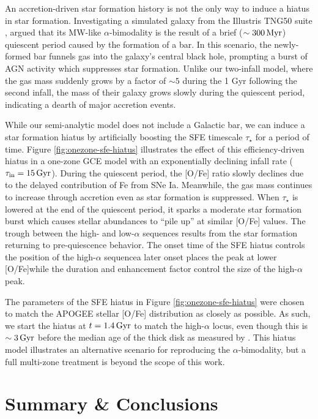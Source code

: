 \documentclass[twocolumn,twocolappendix,linenumbers]{aastex631}
\newcommand{\Gyr}{\,{\rm Gyr}}
\begin{document}
An accretion-driven star formation history is not the only way to induce a hiatus in star formation. Investigating a simulated galaxy from the Illustris TNG50 suite \citep{pillepich_first_2019,nelson_first_2019,nelson_illustristng_2019}, \citet{beane_rising_2024} argued that its MW-like $\alpha$-bimodality is the result of a brief ($\sim300\,{\rm Myr}$) quiescent period caused by the formation of a bar. In this scenario, the newly-formed bar funnels gas into the galaxy's central black hole, prompting a burst of AGN activity which suppresses star formation. Unlike our two-infall model, where the gas mass suddenly grows by a factor of $\sim5$ during the 1 Gyr following the second infall, the mass of their galaxy grows slowly during the quiescent period, indicating a dearth of major accretion events.

While our semi-analytic model does not include a Galactic bar, we can induce a star formation hiatus by artificially boosting the SFE timescale $\tau_\star$ for a period of time. Figure \ref{fig:onezone-sfe-hiatus} illustrates the effect of this efficiency-driven hiatus in a one-zone GCE model with an exponentially declining infall rate ($\tau_{\rm in}=15\Gyr$). During the quiescent period, the [O/Fe] ratio slowly declines due to the delayed contribution of Fe from SNe Ia. Meanwhile, the gas mass continues to increase through accretion even as star formation is suppressed. When $\tau_\star$ is lowered at the end of the quiescent period, it sparks a moderate star formation burst which causes stellar abundances to ``pile up'' at similar [O/Fe] values. The trough between the high- and low-$\alpha$ sequences results from the star formation returning to pre-quiescence behavior. The onset time of the SFE hiatus controls the position of the high-$\alpha$ sequence\textemdash a later onset places the peak at lower [O/Fe]\textemdash while the duration and enhancement factor control the size of the high-$\alpha$ peak.

The parameters of the SFE hiatus in Figure \ref{fig:onezone-sfe-hiatus} were chosen to match the APOGEE stellar [O/Fe] distribution as closely as possible. As such, we start the hiatus at $t=1.4\Gyr$ to match the high-$\alpha$ locus, even though this is $\sim3\Gyr$ before the median age of the thick disk as measured by \citet{pinsonneault_apokasc-3_2025}. This hiatus model illustrates an alternative scenario for reproducing the $\alpha$-bimodality, but a full multi-zone treatment is beyond the scope of this work.

\section{Summary \& Conclusions}
\label{sec:conclusions}
\end{document}
